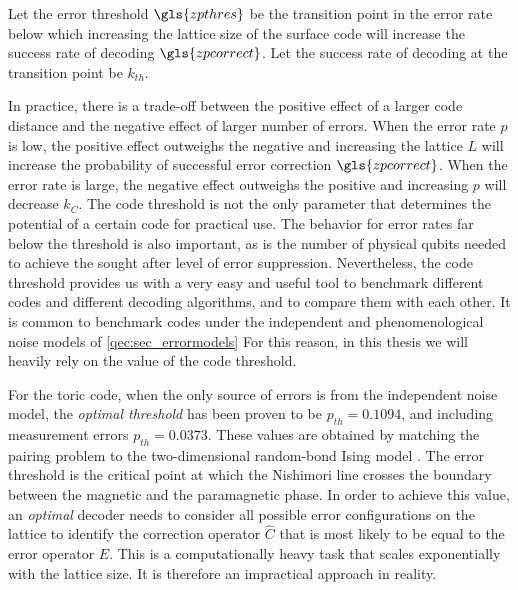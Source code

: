 \begin{definition}\label{def:pthres}
  Let the error threshold $\gls{zpthres}$ be the transition point in the error rate below which increasing the lattice size of the surface code will increase the success rate of decoding $\gls{zpcorrect}$. Let the success rate of decoding at the transition point be $k_{th}$. 
\end{definition}

In practice, there is a trade-off between the positive effect of a larger code distance and the negative effect of larger number of errors. When the error rate $p$ is low, the positive effect outweighs the negative and increasing the lattice $L$ will increase the probability of successful error correction $\gls{zpcorrect}$. When the error rate is large, the negative effect outweighs the positive and increasing $p$ will decrease $k_C$. The code threshold is not the only parameter that determines the potential of a certain code for practical use. The behavior for error rates far below the threshold is also important, as is the number of physical qubits needed to achieve the sought after level of error suppression. Nevertheless, the code threshold provides us with a very easy and useful tool to benchmark different codes and different decoding algorithms, and to compare them with each other. It is common to benchmark codes under the independent and phenomenological noise models of \ref{qec:sec_errormodels} For this reason, in this thesis we will heavily rely on the value of the code threshold. 

For the toric code, when the only source of errors is from the independent noise model, the \emph{optimal threshold} has been proven to be $p_{th}=0.1094$, and including measurement errors $p_{th} = 0.0373$. These values are obtained by matching the pairing problem to the two-dimensional random-bond Ising model \cite{dennis2002topological}. The error threshold is the critical point at which the Nishimori line crosses the boundary between the magnetic and the paramagnetic phase. In order to achieve this value, an \emph{optimal} decoder needs to consider all possible error configurations on the lattice to identify the correction operator $\hat{C}$ that is most likely to be equal to the error operator $\hat{E}$. This is a computationally heavy task that scales exponentially with the lattice size. It is therefore an impractical approach in reality.

